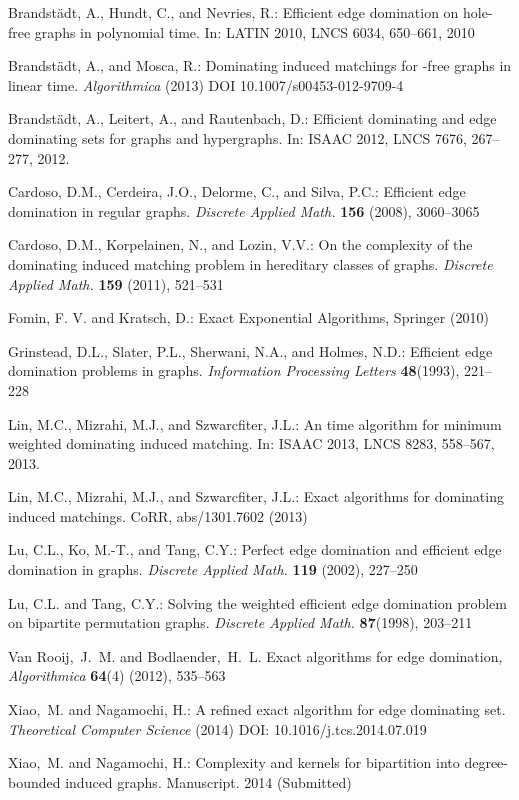 \documentclass{elsart_TR2}
\begin{document}
\begin{thebibliography}{99}
Brandst\"{a}dt, A., Hundt, C., and Nevries, R.:
Efficient edge domination on hole-free
graphs in polynomial time. In:  LATIN 2010, LNCS 6034,  650--661, 2010

Brandst\"{a}dt, A., and Mosca, R.:
Dominating induced matchings for -free graphs in linear time.
\emph{Algorithmica} (2013) DOI 10.1007/s00453-012-9709-4

Brandst\"{a}dt, A., Leitert, A., and Rautenbach, D.:
Efficient dominating and edge dominating sets for graphs and hypergraphs.
In: ISAAC 2012, LNCS 7676,  267--277, 2012.

Cardoso, D.M., Cerdeira, J.O., Delorme, C., and Silva, P.C.:
Efficient edge domination in regular graphs.
\emph{Discrete Applied Math.} \textbf{156} (2008), 3060--3065

Cardoso, D.M., Korpelainen, N., and Lozin, V.V.:
On the complexity of the dominating induced matching problem in hereditary classes of graphs.
\emph{Discrete Applied Math.} \textbf{159} (2011), 521--531

Fomin, F. V.  and Kratsch, D.:
\newblock Exact Exponential Algorithms, Springer (2010)

Grinstead, D.L., Slater, P.L., Sherwani, N.A., and Holmes, N.D.:
Efficient edge domination problems in graphs.
\emph{Information Processing Letters} \textbf{48}(1993), 221--228


Lin, M.C., Mizrahi, M.J., and Szwarcfiter, J.L.:
An  time algorithm for minimum
weighted dominating induced matching.
In: ISAAC 2013, LNCS 8283,  558--567, 2013.

Lin, M.C., Mizrahi, M.J., and Szwarcfiter, J.L.:
Exact algorithms for dominating induced matchings. CoRR, abs/1301.7602 (2013)


Lu, C.L., Ko, M.-T., and Tang, C.Y.:
Perfect edge domination and efficient edge domination
in graphs.
\emph{Discrete Applied Math.} \textbf{119} (2002), 227--250

Lu, C.L. and Tang, C.Y.:
Solving the weighted efficient edge domination problem on bipartite permutation graphs.
\emph{Discrete Applied Math.} \textbf{87}(1998), 203--211

Van Rooij,~J.~M. and  Bodlaender,~H.~L.
Exact algorithms for edge domination,
\emph{Algorithmica} \textbf{64}(4) (2012),  535--563

Xiao,~M.  and Nagamochi, H.:
\newblock A refined exact algorithm for edge dominating set.
\newblock \emph{Theoretical Computer Science }(2014) DOI: 10.1016/j.tcs.2014.07.019

Xiao,~M.  and Nagamochi, H.:
\newblock Complexity and kernels for bipartition into degree-bounded induced graphs.
\newblock Manuscript. 2014 (Submitted)





\end{thebibliography}
\end{document}
